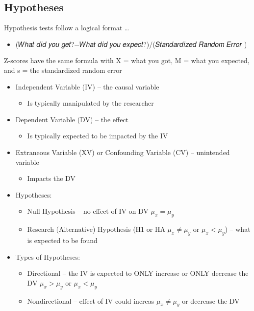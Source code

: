 \documentclass[]{article}
\begin{document}
\subsection{Hypotheses}\label{hypotheses}

Hypothesis tests follow a logical format \ldots{}

\begin{itemize}
\itemsep1pt\parskip0pt
\item
  (𝑊ℎ𝑎𝑡 𝑑𝑖𝑑 𝑦𝑜𝑢 𝑔𝑒𝑡?−𝑊ℎ𝑎𝑡 𝑑𝑖𝑑 𝑦𝑜𝑢 𝑒𝑥𝑝𝑒𝑐𝑡?)/(𝑆𝑡𝑎𝑛𝑑𝑎𝑟𝑑𝑖𝑧𝑒𝑑 𝑅𝑎𝑛𝑑𝑜𝑚 𝐸𝑟𝑟𝑜𝑟 )
\end{itemize}

Z-scores have the same formula with X = what you got, M = what you
expected, and s = the standardized random error

\begin{itemize}
\itemsep1pt\parskip0pt
\item
  Independent Variable (IV) -- the causal variable

  \begin{itemize}
  \itemsep1pt\parskip0pt
  \item
    Is typically manipulated by the researcher
  \end{itemize}
\item
  Dependent Variable (DV) -- the effect

  \begin{itemize}
  \itemsep1pt\parskip0pt
  \item
    Is typically expected to be impacted by the IV
  \end{itemize}
\item
  Extraneous Variable (XV) or Confounding Variable (CV) -- unintended
  variable

  \begin{itemize}
  \itemsep1pt\parskip0pt
  \item
    Impacts the DV
  \end{itemize}
\item
  Hypotheses:

  \begin{itemize}
  \itemsep1pt\parskip0pt
  \item
    Null Hypothesis -- no effect of IV on DV $\mu_x = \mu_y$
  \item
    Research (Alternative) Hypothesis (H1 or HA $\mu_x ≠ \mu_y$ or
    $\mu_x < \mu_y$) -- what is expected to be found
  \end{itemize}
\item
  Types of Hypotheses:

  \begin{itemize}
  \itemsep1pt\parskip0pt
  \item
    Directional -- the IV is expected to ONLY increase or ONLY decrease
    the DV $\mu_x > \mu_y$ or $\mu_x < \mu_y$
  \item
    Nondirectional -- effect of IV could increas $\mu_x ≠ \mu_y$ or
    decrease the DV
  \end{itemize}
\end{itemize}
\end{document}
